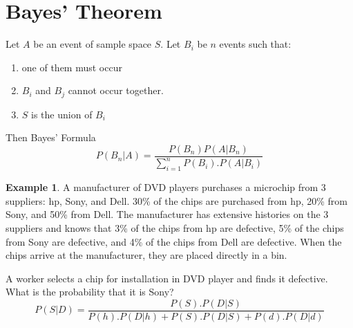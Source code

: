 \documentclass[12pt]{article}
\theoremstyle{definition}
\newtheorem{exmp}{Example}[section]
\begin{document}
\section{Bayes' Theorem}
Let $A$ be an event of sample space $S$.
Let $B_i$ be $n$ events such that:
\begin{enumerate}
    \item one of them must occur 
    \item $B_i$ and $B_j$ cannot occur together.
    \item $S$ is the union of $B_i$
\end{enumerate}
Then \textsf{Bayes' Formula} 
\[
    \displaystyle P(B_n|A) = \frac{P(B_n)P(A|B_n)}{\sum_{i = 1}^n P(B_i).P(A|B_i)}
\]

\begin{exmp}
     A manufacturer of DVD players purchases a microchip from 3 suppliers: hp,
    Sony, and Dell. 30\% of the chips are purchased from hp, 20\% from Sony, and
    50\% from Dell. The manufacturer has extensive histories on the 3 suppliers
    and knows that 3\% of the chips from hp are defective, 5\% of the chips from
    Sony are defective, and 4\% of the chips from Dell are defective. When the
    chips arrive at the manufacturer, they are placed directly in a bin.

    A worker selects a chip for installation in DVD player and finds it
    defective. What is the probability that it is Sony?
    \[
        P(S|D) = \frac{P(S).P(D|S)}{P(h).P(D|h) + P(S).P(D|S) + P(d).P(D|d)}
    \]
\end{exmp}    
\end{document}
